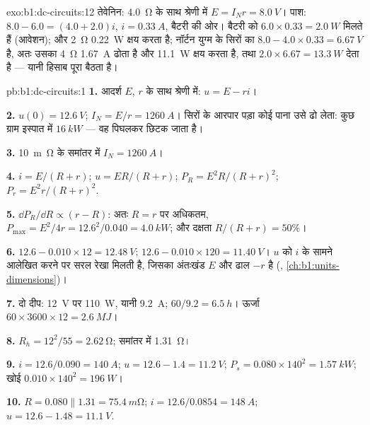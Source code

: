 \begin{solution}{exo:b1:dc-circuits:12}
तेवेनिन: \qty{4.0}{\ohm} के साथ श्रेणी में $E = I_N r = \qty{8.0}{V}$।
पाश: $8.0 - 6.0 = (4.0 + 2.0)i$, $i = \qty{0.33}{A}$, बैटरी की ओर।
बैटरी को $6.0 \times 0.33 = \qty{2.0}{W}$ मिलते हैं (आवेशन); और
\qty{2}{\ohm}  \qty{0.22}{W} क्षय करता है; नॉर्टन युग्म के सिरों का
 $8.0 - 4.0 \times 0.33 = \qty{6.67}{V}$ है, अतः उसका
\qty{4}{\ohm} \qty{1.67}{A} ढोता है और \qty{11.1}{W} क्षय करता है, तथा
 $2.0 \times 6.67 = \qty{13.3}{W}$ देता है --- यानी हिसाब
पूरा बैठता है।
\end{solution}

\begin{solution}{pb:b1:dc-circuits:1}
\textbf{1.} आदर्श  $E$, $r$ के साथ श्रेणी में: $u = E - ri$।

\textbf{2.} $u(0) = \qty{12.6}{V}$; $I_N = E/r = \qty{1260}{A}$। सिरों के
आरपार पड़ा कोई पाना उसे ढो लेता: कुछ ग्राम इस्पात में $\qty{16}{kW}$
--- वह पिघलकर छिटक जाता है।

\textbf{3.} \qty{10}{m\ohm} के समांतर में  $I_N = \qty{1260}{A}$।

\textbf{4.} $i = E/(R + r)$; $u = ER/(R + r)$; $P_R = E^2R/(R + r)^2$;
$P_r = E^2r/(R + r)^2$.

\textbf{5.} $\dd P_R/\dd R \propto (r - R)$: अतः $R = r$ पर अधिकतम,
$P_{\max} = E^2/4r = 12.6^2/0.040 = \qty{4.0}{kW}$; और दक्षता
$R/(R + r) = 50\%$।

\textbf{6.} $12.6 - 0.010 \times 12 = \qty{12.48}{V}$; $12.6 - 0.010 \times
120 = \qty{11.40}{V}$। $u$ को $i$ के सामने आलेखित करने पर सरल रेखा मिलती है,
जिसका अंतःखंड $E$ और ढाल $-r$ है (, \cref{ch:b1:units-dimensions})।

\textbf{7.} दो दीप: \qty{12}{V} पर \qty{110}{W}, यानी \qty{9.2}{A};
$60/9.2 = \qty{6.5}{h}$। ऊर्जा $60 \times 3600 \times 12 = \qty{2.6}{MJ}$।

\textbf{8.} $R_h = 12^2/55 = \qty{2.62}{\ohm}$; समांतर में \qty{1.31}{\ohm}।

\textbf{9.} $i = 12.6/0.090 = \qty{140}{A}$; $u = 12.6 - 1.4 = \qty{11.2}{V}$;
$P_s = 0.080 \times 140^2 = \qty{1.57}{kW}$; खोई $0.010 \times 140^2 =
\qty{196}{W}$।

\textbf{10.} $R = 0.080 \parallel 1.31 = \qty{75.4}{m\ohm}$; $i = 12.6/0.0854
= \qty{148}{A}$; $u = 12.6 - 1.48 = \qty{11.1}{V}$.


\end{solution}

